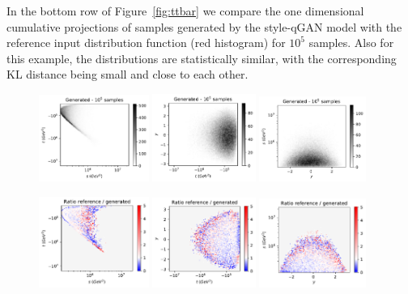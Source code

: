 \documentclass[twocolumn,preprintnumbers,superscriptaddress]{revtex4-2}
\begin{document}
In the bottom row of Figure~\ref{fig:ttbar} we compare the one dimensional
cumulative projections of samples generated by the style-qGAN model with the
reference input distribution function (red histogram) for $10^5$ samples. Also
for this example, the distributions are statistically similar, with the
corresponding KL distance being small and close to each other.

\begin{figure}
  \includegraphics[width=0.32\textwidth]{plots/LHCttbar/s-t_FAKE_100k.pdf}%
  \includegraphics[width=0.3\textwidth]{plots/LHCttbar/t-y_FAKE_100k.pdf}%
  \includegraphics[width=0.31\textwidth]{plots/LHCttbar/y-s_FAKE_100k.pdf}

  \includegraphics[width=0.32\textwidth]{plots/LHCttbar/s-t_RATIO_100k.pdf}%
  \includegraphics[width=0.3\textwidth]{plots/LHCttbar/t-y_RATIO_100k.pdf}%
  \includegraphics[width=0.31\textwidth]{plots/LHCttbar/y-s_RATIO_100k.pdf}


\end{figure}
\end{document}
